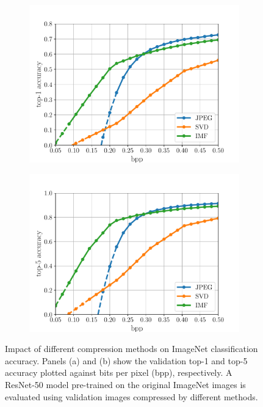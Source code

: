\begin{figure}[t]
	\centering
	\begin{subfigure}{.5\textwidth}
		\centering
				\includegraphics[width=.95\textwidth]{figures/classification_performance_top1.pdf}
		\caption{}
		\label{fig: top1-vs-bpp imagenet}
	\end{subfigure}%
	\begin{subfigure}{.5\textwidth}
		\centering
				\includegraphics[width=.95\textwidth]{figures/classification_performance_top5.pdf}
		\caption{}
		\label{fig: top5-vs-bpp imagenet}
	\end{subfigure}
	\caption{Impact of different compression methods on ImageNet classification accuracy. Panels (a) and (b) show the validation top-1 and top-5 accuracy plotted against bits per pixel (bpp), respectively. A ResNet-50 model pre-trained on the original ImageNet images is evaluated using validation images compressed by different methods.}
	\label{fig:imagenet_classification}
\end{figure}


